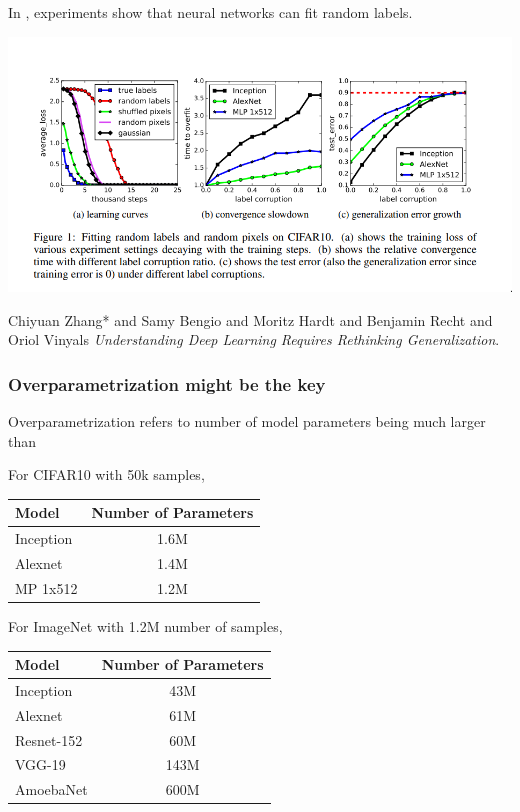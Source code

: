\documentclass{beamer}   	%
\theoremstyle{definition}
\begin{document}
\begin{frame}
In \cite{latexcompanion}, experiments show that neural networks can fit random labels.

\includegraphics[width=\linewidth]{overfit_random_noise.png}

\begin{thebibliography}{9}
\scriptsize
{} 
Chiyuan Zhang* and Samy Bengio and Moritz Hardt and Benjamin Recht and Oriol Vinyals
\textit{Understanding Deep Learning Requires Rethinking Generalization}.
\end{thebibliography}
\end{frame}

\begin{frame}[t]
\frametitle{Overparametrization might be the key}

Overparametrization refers to number of model parameters being much larger than

For CIFAR10 with 50k samples,

\begin{table}[h]
\centering
\begin{tabular}{|l|c|}
\hline
\textbf{Model} & \textbf{Number of Parameters} \\
\hline
Inception & 1.6M \\
Alexnet & 1.4M \\
MP 1x512 & 1.2M\\
\hline
\end{tabular}
\label{tab:my_label}
\end{table}

For ImageNet with 1.2M number of samples,
\begin{table}[h]
\centering
\begin{tabular}{|l|c|}
\hline
\textbf{Model} & \textbf{Number of Parameters} \\
\hline
Inception & 43M \\
Alexnet & 61M \\
Resnet-152 & 60M\\
VGG-19 & 143M\\
AmoebaNet & 600M\\
\hline
\end{tabular}
\end{table}
\end{frame}
\end{document}
